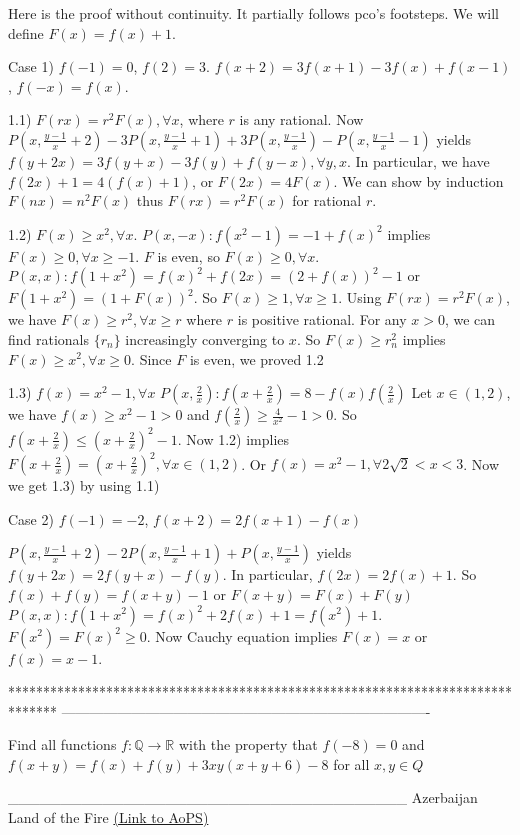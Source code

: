 \begin{solution}
	Here is the proof without continuity. It partially follows pco's footsteps.
We will define $F(x)=f(x)+1$.

Case 1) $f(-1)=0$, $f(2)=3$. $f(x+2)=3f(x+1)-3f(x)+f(x-1)$, $f(-x)=f(x)$.

1.1) $F(rx)=r^2F(x),\forall x$, where $r$ is any rational.
Now $P(x,\frac{y-1}x+2)-3P(x,\frac{y-1}x+1)+3P(x,\frac{y-1}x)-P(x,\frac{y-1}x-1)$  yields
$f(y+2x)=3f(y+x)-3f(y)+f(y-x),\forall y,x$.
In particular, we have $f(2x)+1=4(f(x)+1)$, or $F(2x)=4F(x)$.
We can show by induction $F(nx)=n^2F(x)$ thus $F(rx)=r^2F(x)$ for rational $r$.

1.2) $F(x)\geq x^2,\forall x$.
$P(x,-x): f(x^2-1)=-1+f(x)^2$ implies $F(x)\geq0,\forall x\geq-1$. $F$ is even, so $F(x)\geq0,\forall x$.
$P(x,x):f(1+x^2)=f(x)^2+f(2x)=(2+f(x))^2-1$ or $F(1+x^2)=(1+F(x))^2$. So $F(x)\geq1,\forall x\geq1$. 
Using $F(rx)=r^2F(x)$, we have $F(x)\geq r^2,\forall x\geq r$ where $r$ is positive rational. 
For any $x>0$, we can find rationals $\{r_n\}$ increasingly converging to $x$. So $F(x)\geq r_n^2$ implies $F(x)\geq x^2,\forall x\geq0$. Since $F$ is even, we proved 1.2

1.3) $f(x)=x^2-1,\forall x$
$P(x,\frac2x):f(x+\frac 2x)=8-f(x)f(\frac2x)$
Let $x\in(1,2)$, we have $f(x)\geq x^2-1>0$ and $f(\frac2x)\geq \frac4{x^2}-1>0$.
So $f(x+\frac2x)\leq (x+\frac2x)^2-1$. Now 1.2) implies $F(x+\frac2x)=(x+\frac2x)^2,\forall x\in(1,2)$. Or $f(x)=x^2-1, \forall 2\sqrt2<x<3$. Now we get 1.3) by using 1.1)

Case 2) $f(-1)=-2$, $f(x+2)=2f(x+1)-f(x)$

$P(x,\frac{y-1}x+2)-2P(x,\frac{y-1}x+1)+P(x,\frac{y-1}x)$ yields
$f(y+2x)=2f(y+x)-f(y)$. In particular, $f(2x)=2f(x)+1$. 
So $f(x)+f(y)=f(x+y)-1$ or $F(x+y)=F(x)+F(y)$
$P(x,x): f(1+x^2)=f(x)^2+2f(x)+1=f(x^2)+1$. $F(x^2)=F(x)^2\geq0$. Now Cauchy equation implies $F(x)=x$ or $f(x)=x-1$.
\end{solution}
*******************************************************************************
-------------------------------------------------------------------------------

\begin{problem}
	Find all functions $f: \mathbb{Q}\to\mathbb{R}$ with the property  that $f(-8)=0$ and $f(x+y)=f(x)+f(y)+3xy(x+y+6)-8$ for all $x,y{\in}Q$


______________________________________
Azerbaijan Land of the Fire 
	\flushright \href{https://artofproblemsolving.com/community/c6h533165}{(Link to AoPS)}
\end{problem}



